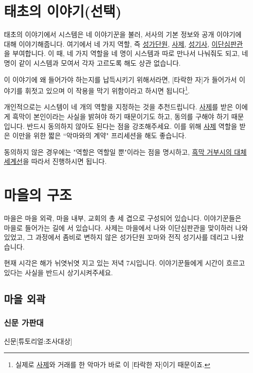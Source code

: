 \documentclass{report}
\begin{document}
	\section{태초의 이야기(선택)}
		태초의 이야기에서 시스템은 네 이야기꾼을 불러, 서사의 기본 정보와 공개 이야기에 대해 이야기해줍니다. 여기에서 네 가지 역할, 즉 \hyperlink{cursed-bard}{성가단원}, \hyperlink{cowardly-priest}{사제}, \hyperlink{corrupt-paladin}{성기사}, \hyperlink{hurt-rogue}{이단심판관}을 부여합니다. 이 때, 네 가지 역할을 네 명이 시스템과 따로 만나서 나눠줘도 되고, 네명이 같이 시스템과 모여서 각자 고르도록 해도 상관 없습니다.
		
		이 이야기에 왜 들어가야 하는지를 납득시키기 위해서라면, [타락한 자]가 들어가서 이야기를 휘젓고 있으며 이 작용을 막기 위함이라고 하시면 됩니다\footnote{실제로 \hyperlink{cowardly-priest}{사제}와 거래를 한 악마가 바로 이 [타락한 자]이기 때문이죠.}.
		
		개인적으로는 시스템이 네 개의 역할을 지정하는 것을 추천드립니다. \hyperlink{cowardly-priest}{사제}를 받은 이에게 흑막이 본인이라는 사실을 밝혀야 하기 때문이기도 하고, 동의를 구해야 하기 때문입니다. 반드시 동의하지 않아도 된다는 점을 강조해주세요. 이를 위해 \hyperlink{cowardly-priest}{사제} 역할을 받은 이만을 위한 짧은 ``악마와의 계약" 프리세션을 해도 좋습니다.
		
		동의하지 않은 경우에는 "역할은 역할일 뿐"이라는 점을 명시하고, \hyperlink{alternative:no-criminal}{흑막 거부시의 대체 세계선}을 따라서 진행하시면 됩니다.
	
	\section{마을의 구조}
		마을은 마을 외곽, 마을 내부, 교회의 총 세 겹으로 구성되어 있습니다. 이야기꾼들은 마을로 들어가는 길에 서 있습니다. 사제는 마을에서 나와 이단심판관을 맞이하러 나와있었고, 그 과정에서 좀비로 변하지 않은 성가단원 꼬마와 전직 성기사를 데리고 나왔습니다.
		
		현재 시각은 해가 뉘엿뉘엿 지고 있는 저녁 7시입니다. 이야기꾼들에게 시간이 흐르고 있다는 사실을 반드시 상기시켜주세요.
		
			\subsection{마을 외곽}
				\hypertarget{search:newspaper-stand}{}
				\subsubsection*{신문 가판대}
					\begin{story}{신문}{[튜토리얼:조사대상]}
						
						
					\end{story}
				
\end{document}
